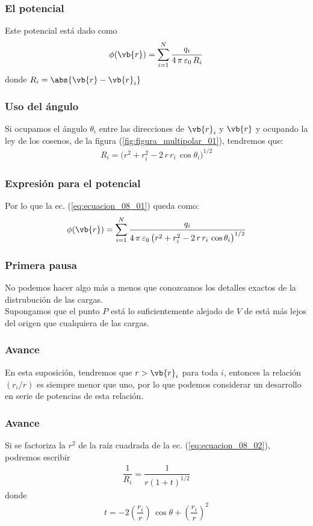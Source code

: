 \begin{frame}
\frametitle{El potencial}
Este potencial está dado como
\begin{align}
\phi(\vb{r}) = \sum_{i=1}^{N} \dfrac{q_{i}}{4 \,\pi \, \varepsilon_{0} \, R_{i}}
\label{eq:ecuacion_08_01}
\end{align}
donde $R_{i} = \abs{\vb{r} - \vb{r}_{i}}$
\end{frame}
\begin{frame}
\frametitle{Uso del ángulo}
Si ocupamos el ángulo $\theta_{i}$ entre las direcciones de $\vb{r}_{i}$ y $\vb{r}$ y ocupando la ley de los cosenos, de la figura (\ref{fig:figura_multipolar_01}), tendremos que:
\begin{align}
R_{i} = \big( r^{2} + r_{i}^{2} - 2 \, r \, r_{i} \, \cos \theta_{i} \big)^{1/2}
\label{eq:ecuacion_08_02}
\end{align}
\end{frame}
\begin{frame}
\frametitle{Expresión para el potencial}
Por lo que la ec. (\ref{eq:ecuacion_08_01}) queda como:
\begin{align}
\phi(\vb{r}) = \sum_{i=1}^{N} \dfrac{q_{i}}{4 \,\pi \, \varepsilon_{0} \, \big( r^{2} + r_{i}^{2} - 2 \, r \, r_{i} \, \cos \theta_{i} \big)^{1/2}}
\label{eq:ecuacion_08_03}
\end{align}
\end{frame}
\begin{frame}
\frametitle{Primera pausa}
No podemos hacer algo más a menos que conozcamos los detalles exactos de la distrubución de las cargas.
\\
\bigskip
\pause
Supongamos que el punto $P$ está lo suficientemente alejado de $V$ de está más lejos del origen que cualquiera de las cargas.
\end{frame}
\begin{frame}
\frametitle{Avance}
En esta suposición, tendremos que $r > \vb{r}_{i}$ para toda $i$, entonces la relación $(r_{i}/r)$ es siempre menor que uno, por lo que podemos considerar un desarrollo en serie de potencias de esta relación.
\end{frame}
\begin{frame}
\frametitle{Avance}
Si se factoriza la $r^{2}$ de la raíz cuadrada de la ec. (\ref{eq:ecuacion_08_02}), podremos escribir
\begin{align}
\dfrac{1}{R_{i}} = \dfrac{1}{r (1 + t)^{1/2}}
\label{eq:ecuacion_08_04}
\end{align}
\pause
donde
\begin{align}
t = -2 \left( \dfrac{r_{i}}{r} \right) \, \cos \theta + \left( \dfrac{r_{i}}{r} \right)^{2}
\label{eq:ecuacion_08_05}
\end{align}
\end{frame}
